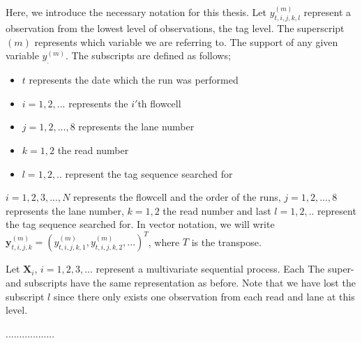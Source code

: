 Here, we introduce the necessary notation for this thesis. Let $y^{(m)}_{t,i,j,k,l}$ represent a observation from the lowest level of observations, the tag level. The superscript $(m)$ represents which variable we are referring to. The support of any given variable $y^{(m)}_.$. The subscripts are defined as follows;
\begin{itemize}
\item $t$ represents the date which the run was performed
\item $i=1,2,...$ represents the $i'$th flowcell  
\item $j=1,2,...,8$ represents the lane number
\item $k=1,2$ the read number
\item $l=1,2,..$ represent the tag sequence searched for
\end{itemize}

$i=1,2,3,...,N$ represents the flowcell and the order of the runs, $j=1,2,...,8$ represents the lane number, $k=1,2$ the read number and last $l=1,2,..$ represent the tag sequence searched for. In vector notation, we will write $\mathbf{y}^{(m)}_{t,i,j,k}=(y^{(m)}_{t,i,j,k,1},y^{(m)}_{t,i,j,k,2},...)^T$, where $T$ is the transpose.

Let $\mathbf{X}_i$, $i=1,2,3,...$ represent a multivariate sequential process. Each  
 The super- and subscripts have the same representation as before. Note that we have lost the subscript $l$ since there only exists one observation from each read and lane at this level.  

 ..................
 
